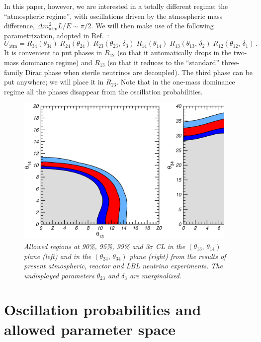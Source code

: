 \documentclass[12pt]{elsart}
\newcommand{\Dmq}{\Delta m^2}
\newcommand{\Atm}{\text{atm}}
\begin{document}
In this paper, however, we are interested in a totally different
regime: the ``atmospheric regime'', with oscillations driven by the
atmospheric mass difference, $ \Dmq_\Atm L/ E \sim \pi/2$.  We will
then make use of the following parametrization, adopted in
Ref.~\cite{Maltoni:2007zf}:
%
\begin{equation}
    \label{eq:3+1param2}
    U_\text{atm} =
    R_{34}(\theta_{34}) \; R_{24}(\theta_{24}) \;
    R_{23}(\theta_{23} ,\, \delta_3) \;
    R_{14}(\theta_{14}) \; R_{13}(\theta_{13} ,\, \delta_2) \; 
    R_{12}(\theta_{12} ,\, \delta_1) \,.
\end{equation}
%
It is convenient to put phases in $R_{12}$ (so that it automatically
drops in the two-mass dominance regime) and $R_{13}$ (so that it
reduces to the ``standard'' three-family Dirac phase when sterile
neutrinos are decoupled). The third phase can be put anywhere; we will
place it in $R_{23}$.  Note that in the one-mass dominance regime all
the phases disappear from the oscillation probabilities.

\begin{figure}[t] \centering
    \includegraphics[width=0.95\textwidth]{fig.present.eps}
    \caption{\label{fig:present}\sl%
      Allowed regions at 90\%, 95\%, 99\% and 3$\sigma$ CL in the
      $(\theta_{13},\, \theta_{14})$ plane (left) and in the
      $(\theta_{24},\, \theta_{34})$ plane (right) from the results of
      present atmospheric, reactor and LBL neutrino experiments. The
      undisplayed parameters $\theta_{23}$ and $\delta_3$ are
      marginalized.}
\end{figure}

\section{Oscillation probabilities and allowed parameter space}
\label{sec:probs}
\end{document}
